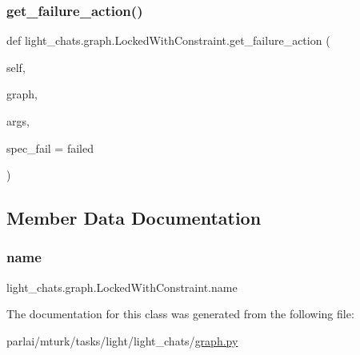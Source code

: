 \subsubsection{\texorpdfstring{get\+\_\+failure\+\_\+action()}{get\_failure\_action()}}
{\footnotesize\ttfamily def light\+\_\+chats.\+graph.\+Locked\+With\+Constraint.\+get\+\_\+failure\+\_\+action (\begin{DoxyParamCaption}\item[{}]{self,  }\item[{}]{graph,  }\item[{}]{args,  }\item[{}]{spec\+\_\+fail = {\ttfamily \textquotesingle{}failed\textquotesingle{}} }\end{DoxyParamCaption})}



\subsection{Member Data Documentation}
\mbox{\label{classlight__chats_1_1graph_1_1LockedWithConstraint_ab4ccf9bea5ce492ae5095b06719cf812}} 
\subsubsection{\texorpdfstring{name}{name}}
{\footnotesize\ttfamily light\+\_\+chats.\+graph.\+Locked\+With\+Constraint.\+name\hspace{0.3cm}{\ttfamily [static]}}



The documentation for this class was generated from the following file\+:\begin{DoxyCompactItemize}
\item 
parlai/mturk/tasks/light/light\+\_\+chats/\hyperlink{parlai_2mturk_2tasks_2light_2light__chats_2graph_8py}{graph.\+py}\end{DoxyCompactItemize}
